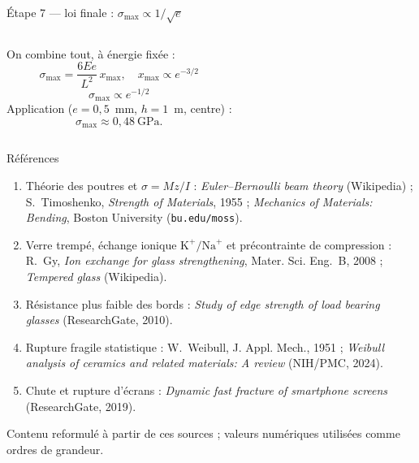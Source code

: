 \documentclass[11pt,aspectratio=169]{beamer}
\begin{document}
\begin{frame}{Étape 7 --- loi finale : $\sigma_{\max}\propto 1/\sqrt{e}$}
  \begin{columns}[c]
    \footnotesize
    On combine tout, à énergie fixée :
    \[ \sigma_{\max}=\frac{6Ee}{L^{2}}\,x_{\max},\quad
       x_{\max}\propto e^{-3/2} \]
    \[ \boxed{\;\sigma_{\max}\propto e^{-1/2}\;} \]
    Application ($e=0{,}5$~mm, $h=1$~m, centre) :
    \[ \sigma_{\max}\approx 0{,}48~\mathrm{GPa}. \]
  \end{columns}
\end{frame}

\begin{frame}{Références}
  \scriptsize
  \begin{enumerate}[leftmargin=1.6em]
    \item Théorie des poutres et $\sigma=Mz/I$ : \emph{Euler--Bernoulli beam
          theory} (Wikipedia) ; S.~Timoshenko, \emph{Strength of Materials}, 1955 ;
          \emph{Mechanics of Materials: Bending}, Boston University
          (\texttt{bu.edu/moss}).
    \item Verre trempé, échange ionique $\mathrm{K}^{+}/\mathrm{Na}^{+}$ et
          précontrainte de compression : R.~Gy, \emph{Ion exchange for glass
          strengthening}, Mater. Sci. Eng.~B, 2008 ; \emph{Tempered glass}
          (Wikipedia).
    \item Résistance plus faible des bords : \emph{Study of edge strength of load
          bearing glasses} (ResearchGate, 2010).
    \item Rupture fragile statistique : W.~Weibull, J. Appl. Mech., 1951 ;
          \emph{Weibull analysis of ceramics and related materials: A review}
          (NIH/PMC, 2024).
    \item Chute et rupture d'écrans : \emph{Dynamic fast fracture of smartphone
          screens} (ResearchGate, 2019).
  \end{enumerate}
  \medskip
  \centering\tiny Contenu reformulé à partir de ces sources ; valeurs numériques
  utilisées comme ordres de grandeur.
\end{frame}
\end{document}
